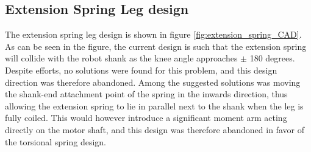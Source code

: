 \subsection{Extension Spring Leg design}
\label{sec:extension_spring_design}

The extension spring leg design is shown in figure \ref{fig:extension_spring_CAD}. As can be seen in the figure, the current design is such that the extension spring will collide with the robot shank as the knee angle approaches $\pm$ 180 degrees. Despite efforts, no solutions were found for this problem, and this design direction was therefore abandoned. Among the suggested solutions was moving the shank-end attachment point of the spring in the inwards direction, thus allowing the extension spring to lie in parallel next to the shank when the leg is fully coiled. This would however introduce a significant moment arm acting directly on the motor shaft, and this design was therefore abandoned in favor of the torsional spring design.

